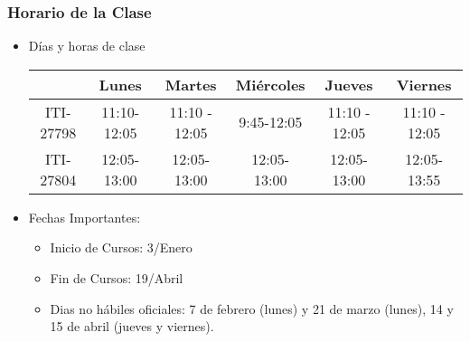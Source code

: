 \begin{frame}
\frametitle{Horario de la Clase}


\begin{itemize}
\item Días y horas de clase
\tiny
\begin{spacing}{1.0}
\begin{center}
\begin{tabular}{c|ccccc}
\hline 
          & Lunes       & Martes        & Miércoles   & Jueves & Viernes       \\  \hline 
ITI-27798 & 11:10-12:05 & 11:10 - 12:05 & 9:45-12:05 &  11:10 - 12:05   & 11:10 - 12:05  \\
ITI-27804 & 12:05-13:00 & 12:05-13:00 & 12:05-13:00 &  12:05-13:00      & 12:05-13:55  \\      
\hline
\end{tabular}
\end{center}
\end{spacing}
\normalsize
\item Fechas Importantes:
\begin{itemize}
\item Inicio de Cursos: 3/Enero
\item Fin de Cursos: 19/Abril
\item Dias no hábiles oficiales: 7 de febrero (lunes) y 21 de marzo (lunes), 14 y 15 de abril (jueves y viernes). 
\end{itemize}
\end{itemize}

\end{frame}


